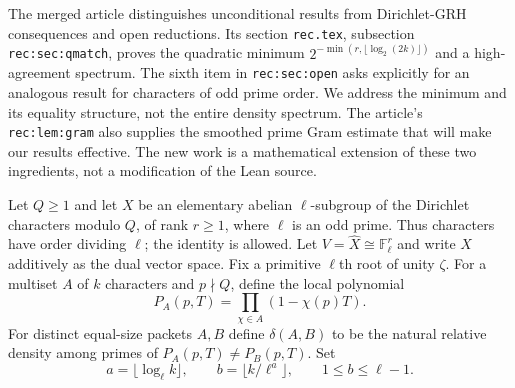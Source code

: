 \documentclass[11pt]{article}
\theoremstyle{remark}\newtheorem{remark}[theorem]{Remark}
\newcommand{\F}{\mathbb F}
\begin{document}
The merged article \cite{article} distinguishes unconditional results from Dirichlet-GRH consequences and open reductions. Its section \texttt{rec.tex}, subsection \texttt{rec:sec:qmatch}, proves the quadratic minimum $2^{-\min(r,\lfloor\log_2(2k)\rfloor)}$ and a high-agreement spectrum. The sixth item in \texttt{rec:sec:open} asks explicitly for an analogous result for characters of odd prime order. We address the minimum and its equality structure, not the entire density spectrum. The article's \texttt{rec:lem:gram} also supplies the smoothed prime Gram estimate that will make our results effective. The new work is a mathematical extension of these two ingredients, not a modification of the Lean source.

Let $Q\ge1$ and let $X$ be an elementary abelian $\ell$-subgroup of the Dirichlet characters modulo $Q$, of rank $r\ge1$, where $\ell$ is an odd prime. Thus characters have order dividing $\ell$; the identity is allowed. Let $V=\widehat X\cong\F_\ell^r$ and write $X$ additively as the dual vector space. Fix a primitive $\ell$th root of unity $\zeta$. For a multiset $A$ of $k$ characters and $p\nmid Q$, define the local polynomial
\[
 P_A(p,T)=\prod_{\chi\in A}(1-\chi(p)T).
\]
For distinct equal-size packets $A,B$ define $\delta(A,B)$ to be the natural relative density among primes of $P_A(p,T)\ne P_B(p,T)$. Set
\[
 a=\lfloor\log_\ell k\rfloor,\qquad b=\lfloor k/\ell^a\rfloor,
 \qquad 1\le b\le\ell-1.
\]
\end{document}
